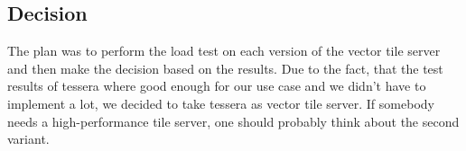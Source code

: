 \subsection{Decision}\label{tile_server_decision}
The plan was to perform the load test on each version of the vector tile server and then make the decision based on the results. Due to the fact, that the test results of tessera where good enough for our use case and we didn't have to implement a lot, we decided to take tessera as vector tile server.
If somebody needs a high-performance tile server, one should probably think about the second variant.
